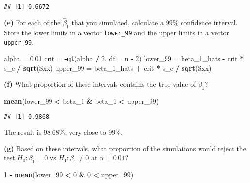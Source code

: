 \documentclass[
]{article}
\newenvironment{Shaded}{\begin{snugshade}}{\end{snugshade}}
\newcommand{\DataTypeTok}[1]{\textcolor[rgb]{0.13,0.29,0.53}{#1}}
\newcommand{\DecValTok}[1]{\textcolor[rgb]{0.00,0.00,0.81}{#1}}
\newcommand{\FloatTok}[1]{\textcolor[rgb]{0.00,0.00,0.81}{#1}}
\newcommand{\KeywordTok}[1]{\textcolor[rgb]{0.13,0.29,0.53}{\textbf{#1}}}
\newcommand{\NormalTok}[1]{#1}
\newcommand{\OperatorTok}[1]{\textcolor[rgb]{0.81,0.36,0.00}{\textbf{#1}}}
\newcommand{\StringTok}[1]{\textcolor[rgb]{0.31,0.60,0.02}{#1}}
\begin{document}
\begin{verbatim}
## [1] 0.6672
\end{verbatim}

\textbf{(e)} For each of the \(\hat{\beta}_1\) that you simulated,
calculate a 99\% confidence interval. Store the lower limits in a vector
\texttt{lower\_99} and the upper limits in a vector \texttt{upper\_99}.

\begin{Shaded}
\begin{Highlighting}[]
\NormalTok{alpha =}\StringTok{ }\FloatTok{0.01}
\NormalTok{crit =}\StringTok{ }\OperatorTok{-}\KeywordTok{qt}\NormalTok{(alpha }\OperatorTok{/}\StringTok{ }\DecValTok{2}\NormalTok{, }\DataTypeTok{df =}\NormalTok{ n }\OperatorTok{-}\StringTok{ }\DecValTok{2}\NormalTok{)}
\NormalTok{lower_}\DecValTok{99}\NormalTok{ =}\StringTok{ }\NormalTok{beta_}\DecValTok{1}\NormalTok{_hats }\OperatorTok{-}\StringTok{ }\NormalTok{crit }\OperatorTok{*}\StringTok{ }\NormalTok{s_e }\OperatorTok{/}\StringTok{ }\KeywordTok{sqrt}\NormalTok{(Sxx)}
\NormalTok{upper_}\DecValTok{99}\NormalTok{ =}\StringTok{ }\NormalTok{beta_}\DecValTok{1}\NormalTok{_hats }\OperatorTok{+}\StringTok{ }\NormalTok{crit }\OperatorTok{*}\StringTok{ }\NormalTok{s_e }\OperatorTok{/}\StringTok{ }\KeywordTok{sqrt}\NormalTok{(Sxx)}
\end{Highlighting}
\end{Shaded}

\textbf{(f)} What proportion of these intervals contains the true value
of \(\beta_1\)?

\begin{Shaded}
\begin{Highlighting}[]
\KeywordTok{mean}\NormalTok{(lower_}\DecValTok{99} \OperatorTok{<}\StringTok{ }\NormalTok{beta_}\DecValTok{1} \OperatorTok{&}\StringTok{ }\NormalTok{beta_}\DecValTok{1} \OperatorTok{<}\StringTok{ }\NormalTok{upper_}\DecValTok{99}\NormalTok{)}
\end{Highlighting}
\end{Shaded}

\begin{verbatim}
## [1] 0.9868
\end{verbatim}

The result is 98.68\%, very close to 99\%.

\textbf{(g)} Based on these intervals, what proportion of the
simulations would reject the test \(H_0: \beta_1 = 0\) vs
\(H_1: \beta_1 \neq 0\) at \(\alpha = 0.01\)?

\begin{Shaded}
\begin{Highlighting}[]
\DecValTok{1} \OperatorTok{-}\StringTok{ }\KeywordTok{mean}\NormalTok{(lower_}\DecValTok{99} \OperatorTok{<}\StringTok{ }\DecValTok{0} \OperatorTok{&}\StringTok{ }\DecValTok{0} \OperatorTok{<}\StringTok{ }\NormalTok{upper_}\DecValTok{99}\NormalTok{)}
\end{Highlighting}
\end{Shaded}
\end{document}

